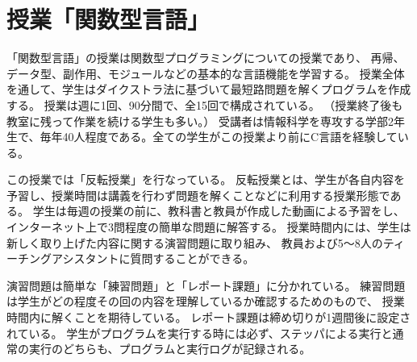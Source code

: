 \section{授業「関数型言語」}
\label{section:experiment__course}
「関数型言語」の授業は関数型プログラミングについての授業であり、
再帰、データ型、副作用、モジュールなどの基本的な言語機能を学習する。
授業全体を通して、学生はダイクストラ法に基づいて最短路問題を解くプログラムを作成する。
授業は週に1回、90分間で、全15回で構成されている。
（授業終了後も教室に残って作業を続ける学生も多い。）
受講者は情報科学を専攻する学部2年生で、毎年40人程度である。全ての学生がこの授業より前にC言語を経験している。

この授業では「反転授業」を行なっている。
反転授業とは、学生が各自内容を予習し、授業時間は講義を行わず問題を解くことなどに利用する授業形態である。
学生は毎週の授業の前に、教科書と教員が作成した動画による予習をし、
インターネット上で3問程度の簡単な問題に解答する。
授業時間内には、学生は新しく取り上げた内容に関する演習問題に取り組み、
教員および5〜8人のティーチングアシスタントに質問することができる。

演習問題は簡単な「練習問題」と「レポート課題」に分かれている。
練習問題は学生がどの程度その回の内容を理解しているか確認するためのもので、
授業時間内に解くことを期待している。
レポート課題は締め切りが1週間後に設定されている。
学生がプログラムを実行する時には必ず、ステッパによる実行と通常の実行のどちらも、プログラムと実行ログが記録される。

